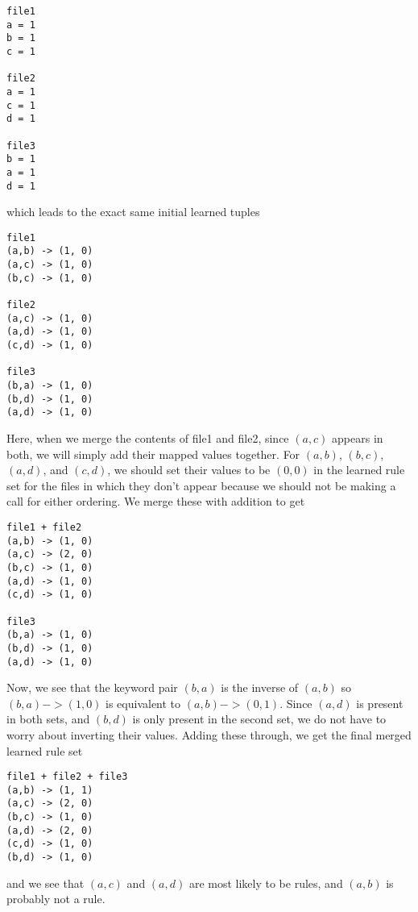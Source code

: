\documentclass[12pt]{article}
\begin{document}
\begin{lstlisting}
file1
a = 1
b = 1
c = 1

file2
a = 1
c = 1
d = 1

file3
b = 1
a = 1
d = 1
\end{lstlisting}
which leads to the exact same initial learned tuples
\begin{lstlisting}
file1
(a,b) -> (1, 0)
(a,c) -> (1, 0)
(b,c) -> (1, 0)

file2
(a,c) -> (1, 0)
(a,d) -> (1, 0)
(c,d) -> (1, 0)

file3
(b,a) -> (1, 0)
(b,d) -> (1, 0)
(a,d) -> (1, 0)
\end{lstlisting}
Here, when we merge the contents of file1 and file2, since $(a,c)$ appears in both, we will simply add their mapped values together. For $(a,b)$, $(b,c)$, $(a,d)$, and $(c,d)$, we should set their values to be $(0,0)$ in the learned rule set for the files in which they don't appear because we should not be making a call for either ordering. We merge these with addition to get
\begin{lstlisting}
file1 + file2
(a,b) -> (1, 0)
(a,c) -> (2, 0)
(b,c) -> (1, 0)
(a,d) -> (1, 0)
(c,d) -> (1, 0)

file3
(b,a) -> (1, 0)
(b,d) -> (1, 0)
(a,d) -> (1, 0)
\end{lstlisting}
Now, we see that the keyword pair $(b,a)$ is the inverse of $(a,b)$ so $(b,a) -> (1, 0)$ is equivalent to $(a,b) -> (0, 1)$. Since $(a,d)$ is present in both sets, and $(b,d)$ is only present in the second set, we do not have to worry about inverting their values. Adding these through, we get the final merged learned rule set
\begin{lstlisting}
file1 + file2 + file3
(a,b) -> (1, 1)
(a,c) -> (2, 0)
(b,c) -> (1, 0)
(a,d) -> (2, 0)
(c,d) -> (1, 0)
(b,d) -> (1, 0)
\end{lstlisting}
and we see that $(a,c)$ and $(a,d)$ are most likely to be rules, and $(a,b)$ is probably not a rule.
\end{document}
